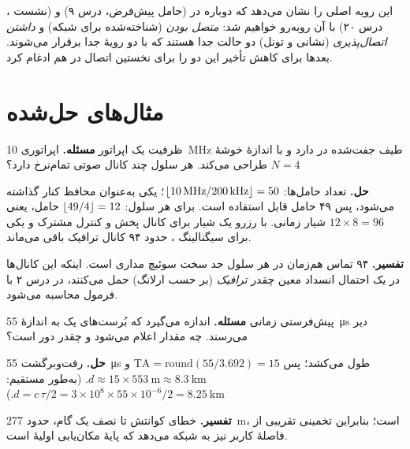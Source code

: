 \documentclass[11pt,a4paper]{article}
\begin{document}
این رویه اصلی را نشان می‌دهد که دوباره در  (حامل پیش‌فرض، درس ۹) و 
(نشست ، درس ۲۰) با آن روبه‌رو خواهیم شد: \emph{متصل بودن} (شناخته‌شده برای شبکه)
و \emph{داشتن اتصال‌پذیری} (نشانی  و تونل) دو حالت جدا هستند که با دو رویهٔ جدا
برقرار می‌شوند.  بعدها برای کاهش تأخیر این دو را برای نخستین اتصال 
در هم ادغام کرد.

\section{مثال‌های حل‌شده}\label{sec:examples}

\begin{examplebox}{ظرفیت یک اپراتور }\label{ex:capacity}
\textbf{مسئله.} اپراتوری \qty{10}{\mega\hertz} طیف جفت‌شده در  دارد و با اندازهٔ
خوشهٔ $N=4$ طراحی می‌کند. هر سلول چند کانال صوتی تمام‌نرخ دارد؟

\textbf{حل.} تعداد حامل‌ها: $\left\lfloor \qty{10}{\mega\hertz}/\qty{200}{\kilo\hertz}\right\rfloor = 50$؛ یکی به‌عنوان
محافظ کنار گذاشته می‌شود، پس ۴۹ حامل قابل استفاده است. برای هر سلول: $\left\lfloor 49/4\right\rfloor = 12$
حامل، یعنی $12\times 8 = 96$ شیار زمانی. با رزرو یک شیار برای کانال پخش و کنترل مشترک و
یکی برای سیگنالینگ ، حدود ۹۴ کانال ترافیک باقی می‌ماند.

\textbf{تفسیر.} ۹۴ تماس هم‌زمان در هر سلول حد سخت سوئیچ مداری است. اینکه این کانال‌ها در
یک احتمال انسداد معین چقدر \emph{ترافیک} (بر حسب ارلانگ) حمل می‌کنند، در درس ۲ با فرمول
 محاسبه می‌شود.
\end{examplebox}

\begin{examplebox}{پیش‌فرستی زمانی}\label{ex:ta}
\textbf{مسئله.}  اندازه می‌گیرد که بُرست‌های یک  به اندازهٔ
\qty{55}{\micro\second} دیر می‌رسند. چه مقدار  اعلام می‌شود و  چقدر دور است؟

\textbf{حل.} رفت‌وبرگشت \qty{55}{\micro\second} طول می‌کشد؛ پس
$\mathrm{TA} = \mathrm{round}(55/3.692) = 15$ و
$d \approx 15\times\qty{553}{\metre} \approx \qty{8.3}{\kilo\metre}$.
(به‌طور مستقیم: $d = c\,\tau/2 = 3\times10^8\times55\times10^{-6}/2 = \qty{8.25}{\kilo\metre}$.)

\textbf{تفسیر.} خطای کوانتش  تا نصف یک گام، حدود \qty{277}{\metre}، است؛ بنابراین
 تخمینی تقریبی از فاصلهٔ کاربر نیز به شبکه می‌دهد که پایهٔ مکان‌یابی اولیهٔ
 است.
\end{examplebox}
\end{document}
